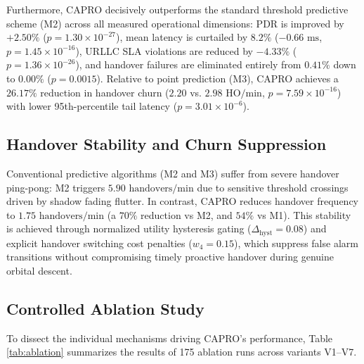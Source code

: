 \documentclass[conference]{IEEEtran}
\begin{document}
Furthermore, CAPRO decisively outperforms the standard threshold predictive scheme (M2) across all measured operational dimensions: PDR is improved by $+2.50\%$ ($p = 1.30 \times 10^{-27}$), mean latency is curtailed by $8.2\%$ ($-0.66\text{ ms}$, $p = 1.45 \times 10^{-16}$), URLLC SLA violations are reduced by $-4.33\%$ ($p = 1.36 \times 10^{-26}$), and handover failures are eliminated entirely from $0.41\%$ down to $0.00\%$ ($p = 0.0015$). Relative to point prediction (M3), CAPRO achieves a $26.17\%$ reduction in handover churn ($2.20$ vs. $2.98\text{ HO/min}$, $p = 7.59 \times 10^{-16}$) with lower 95th-percentile tail latency ($p = 3.01 \times 10^{-6}$).

\subsection{Handover Stability and Churn Suppression}
Conventional predictive algorithms (M2 and M3) suffer from severe handover ping-pong: M2 triggers $5.90\text{ handovers/min}$ due to sensitive threshold crossings driven by shadow fading flutter. In contrast, CAPRO reduces handover frequency to $1.75\text{ handovers/min}$ (a $70\%$ reduction vs M2, and $54\%$ vs M1). This stability is achieved through normalized utility hysteresis gating ($\Delta_{\text{hyst}} = 0.08$) and explicit handover switching cost penalties ($w_4 = 0.15$), which suppress false alarm transitions without compromising timely proactive handover during genuine orbital descent.

\subsection{Controlled Ablation Study}
To dissect the individual mechanisms driving CAPRO's performance, Table \ref{tab:ablation} summarizes the results of 175 ablation runs across variants V1--V7.
\end{document}
